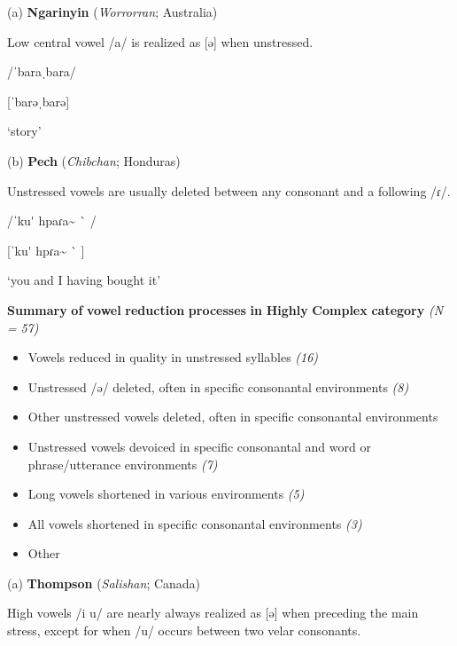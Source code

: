 (a)   \textbf{Ngarinyin} (\textit{Worrorran}; Australia)

Low central vowel /a/ is realized as [ə] when unstressed.

/ˈbaraˌbara/

[ˈbarəˌbarə]

‘story’

\citep[17-18]{Rumsey1978}

(b)  \textbf{Pech} (\textit{Chibchan}; Honduras)

Unstressed vowels are usually deleted between any consonant and a following /ɾ/.

/ˈku\'{} hpaɾa\~{} \`{} /

[ˈku\'{} hpɾa\~{} \`{} ]

‘you and I having bought it’

\citep[23]{Holt1999}

\z

\ea\label{ex:(6.19)}
  \textbf{Summary} \textbf{of} \textbf{vowel} \textbf{reduction} \textbf{processes} \textbf{in} \textbf{Highly} \textbf{Complex} \textbf{category} \textit{(N} \textit{=} \textit{57)}

\begin{itemize}
\item 
Vowels reduced in quality in unstressed syllables \textit{(16)}

\item 
Unstressed /ə/ deleted, often in specific consonantal environments \textit{(8)}

\item 
Other unstressed vowels deleted, often in specific consonantal environments \textit{}

\item 
Unstressed vowels devoiced in specific consonantal and word or phrase/utterance environments \textit{(7)}

\item 
Long vowels shortened in various environments \textit{(5)}

\item 
All vowels shortened in specific consonantal environments \textit{(3)}

\item 
Other \textit{}

\end{itemize}

(a)  \textbf{Thompson} (\textit{Salishan}; Canada)

High vowels /i u/ are nearly always realized as [ə] when preceding the main stress, except for when /u/ occurs between two velar consonants. 

